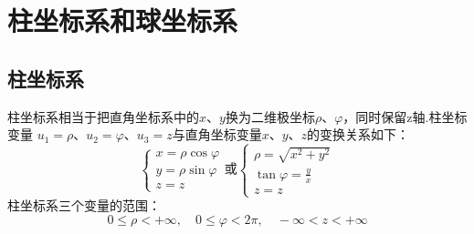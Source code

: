 \documentclass[12pt, UTF8, AutoFakeBold]{ctexart} %
\begin{document}
\tableofcontents %
\clearpage

\section{柱坐标系和球坐标系}

\subsection{柱坐标系}
柱坐标系相当于把直角坐标系中的$x$、$y$换为二维极坐标$\rho$、$\varphi$，同时保留z轴.柱坐标变量
$u_1 = \rho$、$u_2 = \varphi$、$u_3 = z$与直角坐标变量$x$、$y$、$z$的变换关系如下：
\[
    \begin{cases}
        x = \rho \cos\varphi\\
        y = \rho \sin\varphi\\
        z = z
    \end{cases}
    \text{或}
    \begin{cases}
        \rho = \sqrt{x^2 + y^2}\\
        \tan\varphi =  \frac{y}{x}\\
        z = z
    \end{cases}
\]
柱坐标系三个变量的范围：
\[
    0 \leq \rho < +\infty, \quad
    0 \leq \varphi < 2\pi, \quad
    -\infty < z < +\infty
\]

\begin{figure}[htbp]
    \centering
    \qquad
    
\end{figure}
\end{document}
